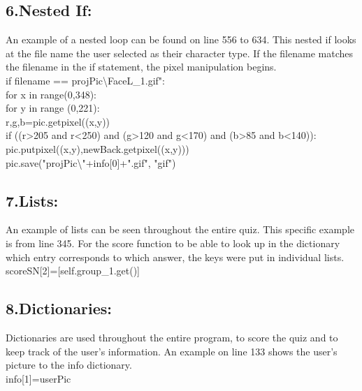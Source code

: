 \documentclass[11pt]{article}%
\begin{document}
\subsection*{6.Nested If:}
An example of a nested loop can be found on line 556 to 634. This nested if looks at the file name the user selected as their character type. If the filename matches the filename in the if statement, the pixel manipulation begins.\\
\indent if filename == projPic\textbackslash FaceL\_1.gif": \\
\indent \indent for x in range(0,348):\\
\indent \indent \indent for y in range (0,221):\\
\indent \indent \indent \indent r,g,b=pic.getpixel((x,y))\\
\indent \indent \indent \indent if ((r\textgreater205 and r\textless250) and (g\textgreater120 and g\textless170) and (b\textgreater85 and b\textless140)):\\
\indent \indent \indent \indent \indent pic.putpixel((x,y),newBack.getpixel((x,y)))\\
\indent \indent pic.save("projPic\textbackslash"+info[0]+".gif", "gif")
 
\subsection*{7.Lists:}
An example of lists can be seen throughout the entire quiz. This specific example is from line 345. For the score function to be able to look up in the dictionary which entry corresponds to which answer, the keys were put in individual lists.\\
\indent scoreSN[2]=[self.group\_1.get()]
\subsection*{8.Dictionaries:}
Dictionaries are used throughout the entire program, to score the quiz and to keep track of the user’s information. An example on line 133 shows the user’s picture to the info dictionary.\\
\indent info[1]=userPic
 
\end{document}
